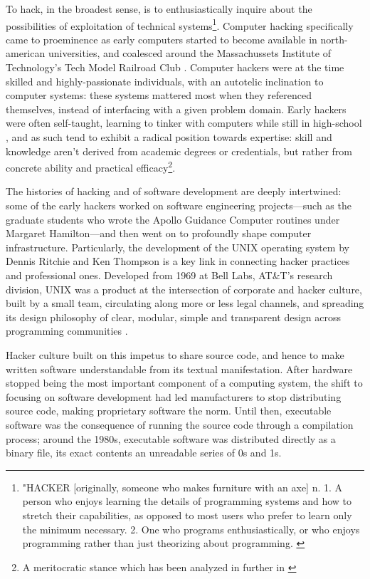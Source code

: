 To hack, in the broadest sense, is to enthusiastically inquire about the possibilities of exploitation of technical systems\footnote{"HACKER [originally, someone who makes furniture with an axe] n. 1. A person who enjoys learning the details of programming systems and how to stretch their capabilities, as opposed to most users who prefer to learn only the minimum necessary. 2. One who programs enthusiastically, or who enjoys programming rather than just theorizing about programming. \citep{dourish_original_1988}}. Computer hacking specifically came to proeminence as early computers started to become available in north-american universities, and coalesced around the Massachussets Institute of Technology's Tech Model Railroad Club \citep{levy_hackers_2010}. Computer hackers were at the time skilled and highly-passionate individuals, with an autotelic inclination to computer systems: these systems mattered most when they referenced themselves, instead of interfacing with a given problem domain. Early hackers were often self-taught, learning to tinker with computers while still in high-school \citep{lammers_programmers_1986}, and as such tend to exhibit a radical position towards expertise: skill and knowledge aren't derived from academic degrees or credentials, but rather from concrete ability and practical efficacy\footnote{A meritocratic stance which has been analyzed in further in  \citep{coleman_aesthetics_2018}}.

The histories of hacking and of software development are deeply intertwined: some of the early hackers worked on software engineering projects—such as the graduate students who wrote the Apollo Guidance Computer routines under Margaret Hamilton—and then went on to profoundly shape computer infrastructure. Particularly, the development of the UNIX operating system by Dennis Ritchie and Ken Thompson is a key link in connecting hacker practices and professional ones. Developed from 1969 at Bell Labs, AT\&T's research division, UNIX was a product at the intersection of corporate and hacker culture, built by a small team, circulating along more or less legal channels, and spreading its design philosophy of clear, modular, simple and transparent design across programming communities \citep{raymond_art_2003}.

Hacker culture built on this impetus to share source code, and hence to make written software understandable from its textual manifestation. After hardware stopped being the most important component of a computing system, the shift to focusing on software development had led manufacturers to stop distributing source code, making proprietary software the norm. Until then, executable software was the consequence of running the source code through a compilation process; around the 1980s, executable software was distributed directly as a binary file, its exact contents an unreadable series of 0s and 1s.

